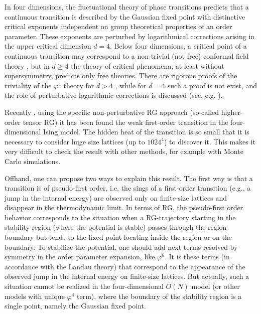 \documentclass[final,twocolumn]{elsarticle}
\begin{document}
In four dimensions, the fluctuational theory of phase transitions predicts that a continuous transition is described by the Gaussian fixed point with distinctive critical exponents independent on group theoretical properties of an order parameter. These exponents are perturbed by logarithmical corrections arising in the upper critical dimension $d=4$. Below four dimensions, a critical point of a continuous transition may correspond to a non-trivial (not free) conformal field theory \cite{Polyakov70}, but in $d\geq4$ the theory of critical phenomena, at least without supersymmetry, predicts only free theories. There are rigorous proofs of the triviality of the $\varphi^4$ theory for $d>4$ \cite{Aizeman81,Aizeman82,Frolich82}, while for $d=4$ such a proof is not exist, and the role of perturbative logarithmic corrections is discussed (see, e.g. \cite{Frolich83,Kenna93,Kenna04,Stevenson05,Balog06,Lundow09,Lundow11,Akiyama19}).

Recently \cite{Akiyama19}, using the specific non-perturbative RG approach (so-called higher-order tensor RG) it has been found the weak first-order transition in the four-dimensional Ising model. The hidden heat of the transition is so small that it is necessary to consider huge size lattices (up to $1024^4$) to discover it. This makes it very difficult to check the result with other methods, for example with Monte Carlo simulations.

Offhand, one can propose two ways to explain this result. The first way is that a transition is of pseudo-first order, i.e. the sings of a first-order transition (e.g., a jump in the internal energy) are observed only on finite-size lattices and disappear in the thermodynamic limit.  In terms of RG, the pseudo-first order behavior corresponds to the situation when a RG-trajectory starting in the stability region (where the potential is stable) passes through the region boundary but tends to the fixed point locating inside the region or on the boundary. To stabilize the potential, one should add next terms resolved by symmetry in the order parameter expansion, like $\varphi^6$. It is these terms (in accordance with the Landau theory) that correspond to the appearance of the observed jump in the internal energy on finite-size lattices. But actually, such a situation cannot be realized in the four-dimensional $O(N)$ model (or other models with unique $\varphi^4$ term), where the boundary of the stability region is a single point, namely the Gaussian fixed point.
\end{document}
